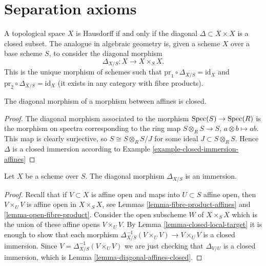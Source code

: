 \section{Separation axioms}
\label{section-separation-axioms}

\noindent
A topological space $X$ is Hausdorff if and only if the
diagonal $\Delta \subset X \times X$ is a closed subset.
The analogue in algebraic geometry is, given a scheme $X$ over
a base scheme $S$, to consider the
diagonal morphism
$$
\Delta_{X/S} : X \longrightarrow X \times_S X.
$$
This is the unique morphism of schemes such that
$\text{pr}_1 \circ \Delta_{X/S} = \text{id}_X$ and
$\text{pr}_2 \circ \Delta_{X/S} = \text{id}_X$ (it exists in
any category with fibre products).

\begin{lemma}
\label{lemma-diagonal-affines-closed}
The diagonal morphism of a morphism between affines is closed.
\end{lemma}

\begin{proof}
The diagonal morphism associated to the morphism
$\mathop{\rm Spec}(S) \to \mathop{\rm Spec}(R)$ is the morphism on spectra
corresponding to the ring
map $S \otimes_R S \to S$, $a \otimes b \mapsto ab$.
This map is clearly surjective, so $S \cong S \otimes_R S/J$
for some ideal $J \subset S \otimes_R S$. Hence
$\Delta$ is a closed immersion according to
Example \ref{example-closed-immersion-affines}
\end{proof}

\begin{lemma}
\label{lemma-diagonal-immersion}
Let $X$ be a scheme over $S$.
The diagonal morphism $\Delta_{X/S}$ is an immersion.
\end{lemma}

\begin{proof}
Recall that if $V \subset X$ is affine open and maps into
$U \subset S$ affine open, then $V \times_U V$ is affine open
in $X \times_S X$, see Lemmas \ref{lemma-fibre-product-affines}
and \ref{lemma-open-fibre-product}.
Consider the open subscheme $W$ of $X \times_S X$ which
is the union of these affine opens $V \times_U V$.
By Lemma \ref{lemma-closed-local-target} it is enough
to show that each morphism
$\Delta_{X/S}^{-1}(V \times_U V) \to V \times_U V$ is
a closed immersion. Since $V = \Delta_{X/S}^{-1}(V \times_U V)$
we are just checking that $\Delta_{V/U}$ is a closed
immersion, which is Lemma \ref{lemma-diagonal-affines-closed}.
\end{proof}

